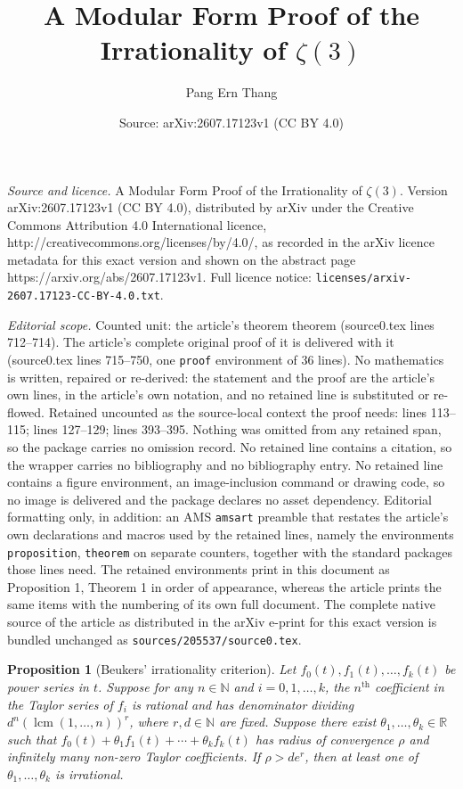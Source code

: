 \documentclass[10pt,a4paper]{amsart}
\title{A Modular Form Proof of the Irrationality of $\zeta\left(3\right)$}
\author{Pang Ern Thang}
\date{Source: arXiv:2607.17123v1 (CC BY 4.0)}
\newtheorem{proposition}{Proposition}
\begin{document}
\maketitle

\noindent\emph{Source and licence.} A Modular Form Proof of the Irrationality of $\zeta\left(3\right)$. Version arXiv:2607.17123v1 (CC BY 4.0), distributed by arXiv under the Creative Commons Attribution 4.0 International licence, http://creativecommons.org/licenses/by/4.0/, as recorded in the arXiv licence metadata for this exact version and shown on the abstract page https://arxiv.org/abs/2607.17123v1. Full licence notice: \texttt{licenses/arxiv-2607.17123-CC-BY-4.0.txt}.\par\smallskip

\noindent\textit{Editorial scope.} Counted unit: the article's theorem theorem (source0.tex lines 712--714). The article's complete original proof of it is delivered with it (source0.tex lines 715--750, one \texttt{proof} environment of 36 lines). No mathematics is written, repaired or re-derived: the statement and the proof are the article's own lines, in the article's own notation, and no retained line is substituted or re-flowed.  Retained uncounted as the source-local context the proof needs: lines 113--115; lines 127--129; lines 393--395.  Nothing was omitted from any retained span, so the package carries no omission record.  No retained line contains a citation, so the wrapper carries no bibliography and no bibliography entry.  No retained line contains a figure environment, an image-inclusion command or drawing code, so no image is delivered and the package declares no asset dependency.  Editorial formatting only, in addition: an AMS \texttt{amsart} preamble that restates the article's own declarations and macros used by the retained lines, namely the environments \texttt{proposition}, \texttt{theorem} on separate counters, together with the standard packages those lines need.  The retained environments print in this document as Proposition 1, Theorem 1 in order of appearance, whereas the article prints the same items with the numbering of its own full document.  The complete native source of the article as distributed in the arXiv e-print for this exact version is bundled unchanged as \texttt{sources/205537/source0.tex}.
\begin{proposition}[Beukers' irrationality criterion]\label{prop: Beukers' irrationality criterion}
Let $f_0\left(t\right),f_1\left(t\right),\ldots,f_k\left(t\right)$ be power series in $t$. Suppose for any $n\in\mathbb{N}$ and $i=0,1,\ldots,k$, the $n^\text{th}$ coefficient in the Taylor series of $f_i$ is rational and has denominator dividing $d^n\left(\operatorname{lcm}\left(1,\ldots,n\right)\right)^r$, where $r,d\in\mathbb{N}$ are fixed. Suppose there exist $\theta_1,\ldots,\theta_k\in\mathbb{R}$ such that $f_0\left(t\right)+\theta_1f_1\left(t\right)+\cdots+\theta_kf_k\left(t\right)$ has radius of convergence $\rho$ and infinitely many non-zero Taylor coefficients. If $\rho>de^r$, then at least one of $\theta_1,\ldots,\theta_k$ is irrational.
\end{proposition}
\end{document}
